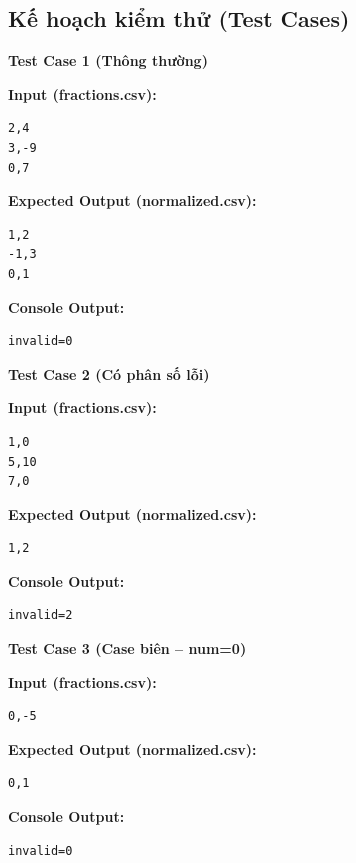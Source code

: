 \subsection{Kế hoạch kiểm thử (Test Cases)}

\textbf{Test Case 1 (Thông thường)}

\textbf{Input (fractions.csv):}
\begin{lstlisting}
2,4
3,-9
0,7
\end{lstlisting}

\textbf{Expected Output (normalized.csv):}
\begin{lstlisting}
1,2
-1,3
0,1
\end{lstlisting}

\textbf{Console Output:}
\begin{lstlisting}
invalid=0
\end{lstlisting}

\vspace{0.5cm}

\textbf{Test Case 2 (Có phân số lỗi)}

\textbf{Input (fractions.csv):}
\begin{lstlisting}
1,0
5,10
7,0
\end{lstlisting}

\textbf{Expected Output (normalized.csv):}
\begin{lstlisting}
1,2
\end{lstlisting}

\textbf{Console Output:}
\begin{lstlisting}
invalid=2
\end{lstlisting}

\vspace{0.5cm}

\textbf{Test Case 3 (Case biên -- num=0)}

\textbf{Input (fractions.csv):}
\begin{lstlisting}
0,-5
\end{lstlisting}

\textbf{Expected Output (normalized.csv):}
\begin{lstlisting}
0,1
\end{lstlisting}

\textbf{Console Output:}
\begin{lstlisting}
invalid=0
\end{lstlisting}
